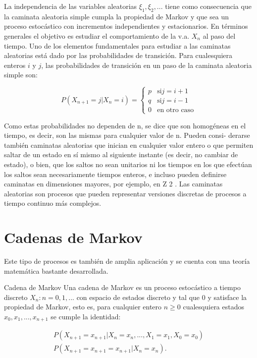 La independencia de las variables aleatorias $\xi_1, \xi_2,...$ tiene como
consecuencia que la caminata aleatoria simple cumpla la propiedad de Markov y
que sea un proceso estocástico con incrementos independientes y estacionarios.
En términos generales el objetivo es estudiar el comportamiento de la v.a. $X_n$
al paso del tiempo. Uno de los elementos fundamentales para estudiar a las
caminatas aleatorias está dado por las probabilidades de transición. Para
cualesquiera enteros $i$ y $j$, las probabilidades de transición en un paso de
la caminata aleatoria simple son:

\begin{equation}
    P(X_{n+1}=j | X_n = i) = \left\lbrace \begin{array}{ll}
        p & \text{si} j = i+1 \\
        q & \text{si} j = i-1 \\
        0 & \text{en otro caso}
    \end{array}\right.
\end{equation}

Como estas probabilidades no dependen de n, se dice que son homogéneas en el
tiempo, es decir, son las mismas para cualquier valor de n. Pueden consi-
derarse también caminatas aleatorias que inician en cualquier valor entero o que
permiten saltar de un estado en sí mismo al siguiente instante (es decir, no
cambiar de estado), o bien, que los saltos no sean unitarios ni los tiempos en
los que efectúan los saltos sean necesariamente tiempos enteros, e incluso
pueden definirse caminatas en dimensiones mayores, por ejemplo, en Z 2 . Las
caminatas aleatorias son procesos que pueden representar versiones discretas de
procesos a tiempo continuo más complejos.

\section{Cadenas de Markov}

Este tipo de procesos es también de amplia aplicación y se cuenta con una teoría
matemática bastante desarrollada.

\begin{theorem}{Cadena de Markov}
Una cadena de Markov es un proceso estocástico a tiempo discreto ${X_n : n=0,
1,...}$ con espacio de estados discreto y tal que 0 y satisface la propiedad de
Markov, esto es, para cualquier entero $n \geq 0$ cualesquiera estados $x_0 , x_1 , . . .
, x_{n+1}$ se cumple la identidad:

\begin{equation}
    \begin{array}{l}
    P(X_{n+1} =  x_{n+1} | X_n = x_n, ..., X_1 = x_1, X_0=x_0) \\
    P(X_{n+1} = x_{n+1} = x_{n+1} | X_n = x_n).
    \end{array}
\end{equation}

\end{theorem}


